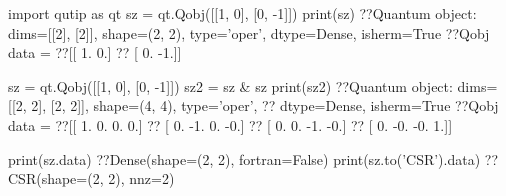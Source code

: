 import qutip as qt
sz = qt.Qobj([[1, 0], [0, -1]]) 
print(sz)
?\pythonoutput?Quantum object: dims=[[2], [2]], shape=(2, 2), type='oper', dtype=Dense, isherm=True
?\pythonoutput?Qobj data =
?\pythonoutput?[[ 1.  0.]
?\pythonoutput? [ 0. -1.]]

sz = qt.Qobj([[1, 0], [0, -1]]) 
sz2 = sz & sz
print(sz2)
?\pythonoutput?Quantum object: dims=[[2, 2], [2, 2]], shape=(4, 4), type='oper',
?\pythonoutput?                dtype=Dense, isherm=True
?\pythonoutput?Qobj data =
?\pythonoutput?[[ 1.  0.  0.  0.]
?\pythonoutput? [ 0. -1.  0. -0.]
?\pythonoutput? [ 0.  0. -1. -0.]
?\pythonoutput? [ 0. -0. -0.  1.]]

print(sz.data)
?\pythonoutput?Dense(shape=(2, 2), fortran=False)
print(sz.to('CSR').data)
?\pythonoutput?CSR(shape=(2, 2), nnz=2)